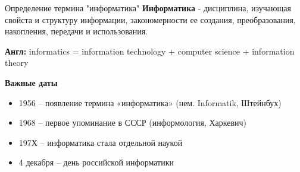 \begin{frame}{Определение термина "информатика"}
\noindent\color[rgb]{0,0.5,0.0}\textbf{Информатика}
\color{black}
- дисциплина, изучающая свойста и структуру информации, закономерности ее создания,
преобразования, накопления, передачи и использования.

\noindent\color[rgb]{0,0.5,0.0}\textbf{Англ: }
\color{black}
informatics = information technology + computer science + information theory
\vspace{1.0em}
\begin{center}
	\textbf{Важные даты}
\end{center}
\begin{itemize}
	\item[\textbullet] 1956 – появление термина «информатика» (нем. Informatik, Штейнбух)
	\item[\textbullet] 1968 – первое упоминание в СССР (информология, Харкевич)
	\item[\textbullet] 197Х – информатика стала отдельной наукой
	\item[\textbullet] 4 декабря – день российской информатики
\end{itemize}
\end{frame}